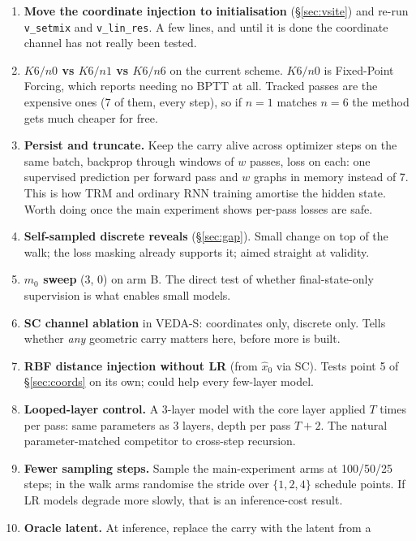 \documentclass[11pt,a4paper]{article}
\newcommand{\xh}{\hat{x}_0}
\newcommand{\code}[1]{\texttt{#1}}
\begin{document}
\begin{enumerate}
  \item \textbf{Move the coordinate injection to initialisation} (\S\ref{sec:vsite}) and
        re-run \code{v\_setmix} and \code{v\_lin\_res}. A few lines, and until it is done
        the coordinate channel has not really been tested.
  \item \textbf{$K6/n0$ vs $K6/n1$ vs $K6/n6$} on the current scheme. $K6/n0$ is
        Fixed-Point Forcing, which reports needing no BPTT at all. Tracked passes are
        the expensive ones (7 of them, every step), so if $n{=}1$ matches $n{=}6$ the
        method gets much cheaper for free.
  \item \textbf{Persist and truncate.} Keep the carry alive across optimizer steps on
        the same batch, backprop through windows of $w$ passes, loss on each: one
        supervised prediction per forward pass and $w$ graphs in memory instead of 7.
        This is how TRM and ordinary RNN training amortise the hidden state. Worth
        doing once the main experiment shows per-pass losses are safe.
  \item \textbf{Self-sampled discrete reveals} (\S\ref{sec:gap}). Small change on top
        of the walk; the loss masking already supports it; aimed straight at validity.
  \item \textbf{$m_0$ sweep} ($3$, $0$) on arm B. The direct test of whether
        final-state-only supervision is what enables small models.
  \item \textbf{SC channel ablation} in VEDA-S: coordinates only, discrete only. Tells
        whether \emph{any} geometric carry matters here, before more is built.
  \item \textbf{RBF distance injection without LR} (from $\xh$ via SC). Tests point 5 of
        \S\ref{sec:coords} on its own; could help every few-layer model.
  \item \textbf{Looped-layer control.} A 3-layer model with the core layer applied $T$
        times per pass: same parameters as 3 layers, depth per pass $T{+}2$. The natural
        parameter-matched competitor to cross-step recursion.
  \item \textbf{Fewer sampling steps.} Sample the main-experiment arms at 100/50/25
        steps; in the walk arms randomise the stride over $\{1,2,4\}$ schedule points.
        If LR models degrade more slowly, that is an inference-cost result.
  \item \textbf{Oracle latent.} At inference, replace the carry with the latent from a

\end{enumerate}
\end{document}
